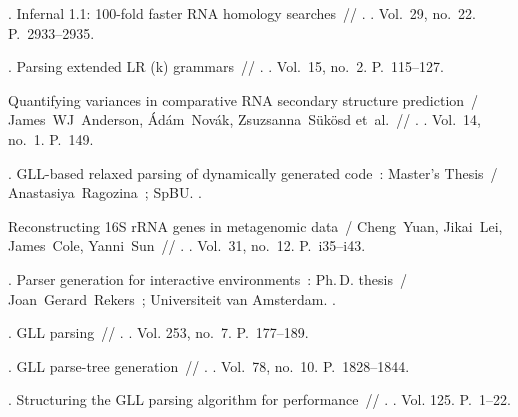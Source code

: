 \begin{thebibliography}{10}
	. Infernal 1.1: 100-fold faster RNA
	homology searches~// . \BibDash
	. \BibDash
	\newblock Vol.~29, no.~22. \BibDash
	\newblock P.~2933--2935.
	
	. Parsing extended {LR} (k)
	grammars~// . \BibDash
	. \BibDash
	\newblock Vol.~15, no.~2. \BibDash
	\newblock P.~115--127.
	
	Quantifying variances in comparative RNA secondary structure prediction~/
	James~WJ~Anderson, {\'A}d{\'a}m~Nov{\'a}k, Zsuzsanna~S{\"u}k{\"o}sd et~al.~//
	\href{http://dx.doi.org/10.1186/1471-2105-14-149}{}. \BibDash
	. \BibDash
	\newblock Vol.~14, no.~1. \BibDash
	\newblock P.~149.
	
	. {GLL}-based relaxed parsing of dynamically
	generated code~: Master’s Thesis~/ Anastasiya~Ragozina~; SpBU. \BibDash
	.
	
	Reconstructing 16S rRNA genes in metagenomic data~/ Cheng~Yuan, Jikai~Lei,
	James~Cole, Yanni~Sun~// . \BibDash
	. \BibDash
	\newblock Vol.~31, no.~12. \BibDash
	\newblock P.~i35--i43.
	
	. Parser generation for interactive environments~:
	Ph.\,D. thesis~/ Joan~Gerard~Rekers~; Universiteit van Amsterdam. \BibDash
	.
	
	. {GLL} parsing~//
	. \BibDash
	. \BibDash
	\newblock Vol. 253, no.~7. \BibDash
	\newblock P.~177--189.
	
	. {GLL} parse-tree generation~//
	. \BibDash
	. \BibDash
	\newblock Vol.~78, no.~10. \BibDash
	\newblock P.~1828--1844.
	
	. Structuring the {GLL} parsing
	algorithm for performance~// .
	\BibDash
	. \BibDash
	\newblock Vol. 125. \BibDash
	\newblock P.~1--22.
	

\end{thebibliography}
